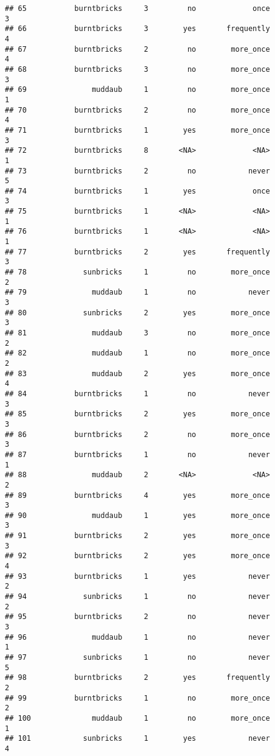 \documentclass[
]{article}
\begin{document}
\begin{verbatim}
## 65           burntbricks     3         no             once         3
## 66           burntbricks     3        yes       frequently         4
## 67           burntbricks     2         no        more_once         4
## 68           burntbricks     3         no        more_once         3
## 69               muddaub     1         no        more_once         1
## 70           burntbricks     2         no        more_once         4
## 71           burntbricks     1        yes        more_once         3
## 72           burntbricks     8       <NA>             <NA>         1
## 73           burntbricks     2         no            never         5
## 74           burntbricks     1        yes             once         3
## 75           burntbricks     1       <NA>             <NA>         1
## 76           burntbricks     1       <NA>             <NA>         1
## 77           burntbricks     2        yes       frequently         3
## 78             sunbricks     1         no        more_once         2
## 79               muddaub     1         no            never         3
## 80             sunbricks     2        yes        more_once         3
## 81               muddaub     3         no        more_once         2
## 82               muddaub     1         no        more_once         2
## 83               muddaub     2        yes        more_once         4
## 84           burntbricks     1         no            never         3
## 85           burntbricks     2        yes        more_once         3
## 86           burntbricks     2         no        more_once         3
## 87           burntbricks     1         no            never         1
## 88               muddaub     2       <NA>             <NA>         2
## 89           burntbricks     4        yes        more_once         3
## 90               muddaub     1        yes        more_once         3
## 91           burntbricks     2        yes        more_once         3
## 92           burntbricks     2        yes        more_once         4
## 93           burntbricks     1        yes            never         2
## 94             sunbricks     1         no            never         2
## 95           burntbricks     2         no            never         3
## 96               muddaub     1         no            never         1
## 97             sunbricks     1         no            never         5
## 98           burntbricks     2        yes       frequently         2
## 99           burntbricks     1         no        more_once         2
## 100              muddaub     1         no        more_once         1
## 101            sunbricks     1        yes            never         4

\end{verbatim}
\end{document}
